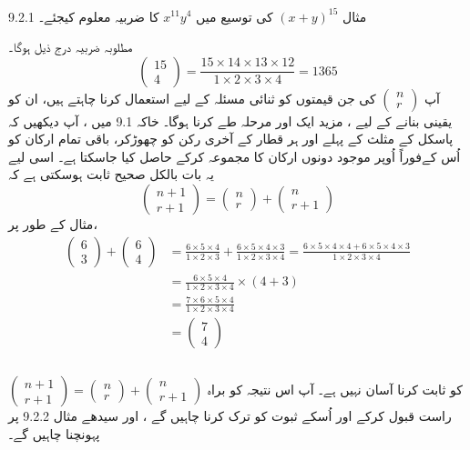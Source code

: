 9.2.1
 مثال 
 \( (x+y)^{15}\)
کی توسیع میں
    \(x^{11}y^{4}\)
کا ضربیہ معلوم کیجئے۔ 

مطلوبہ ضربیہ درج ذیل ہوگا۔
  \[\begin{pmatrix}
    15\\4
     \end{pmatrix}
    =\frac{15\times14\times13\times12}{1\times2\times3\times4}=1365\]  
آپ
    \(\begin{pmatrix}
     n\\r
     \end{pmatrix}\)
  کی جن قیمتوں کو ثنائی مسئلہ کے لیے استعمال کرنا چاہتے ہیں، ان کو یقینی بنانے کے لیے ،    مزید ایک اور مرحلہ طے کرنا ہوگا۔   خاکہ  
  9.1
  میں ،  آپ دیکھیں کہ پاسکل کے مثلث کے  پہلے اور ہر قطار کے آخری رکن کو چھوڑکر،   باقی تمام ارکان کو اُس کےفوراً    اُوپر موجود دونوں ارکان کا مجموعہ کرکے حاصل کیا جاسکتا ہے۔ اسی لیے یہ بات بالکل صحیح  ثابت  ہوسکتی ہے کہ 
   \[    \begin{pmatrix}
     n+1\\r+1
     \end{pmatrix}
     =
     \begin{pmatrix}
     n\\r
     \end{pmatrix}
     +
     \begin{pmatrix}
    n\\r+1
     \end{pmatrix}\]
  مثال کے طور پر،
\begin{align*}
\begin{pmatrix}6\\3\end{pmatrix}+\begin{pmatrix}6\\4\end{pmatrix}&=\frac{6\times5\times4}{1\times2\times3}+\frac{6\times5\times4\times3}{1\times2\times3\times4}=\frac{6\times5\times4\times4+6\times5\times4\times3}{1\times2\times3\times4}\\
&=\frac{6\times5\times4}{1\times2\times3\times4}\times(4+3)\\
&=\frac{7\times6\times5\times4}{1\times2\times3\times4}\\
&=\begin{pmatrix}7\\4\end{pmatrix}\\
\end{align*}
  \\
  \(  \begin{pmatrix}
     n+1\\r+1
     \end{pmatrix}
     =
     \begin{pmatrix}
    n\\r
     \end{pmatrix}
     +
     \begin{pmatrix}
     n\\r+1
     \end{pmatrix}\)
کو  ثابت کرنا آسان نہیں ہے۔  آپ اس نتیجہ کو براہ راست قبول کرکے اور اُسکے ثبوت کو ترک کرنا چاہیں گے ،  اور سیدھے مثال 
9.2.2
  پر پہونچنا چاہیں گے۔  

